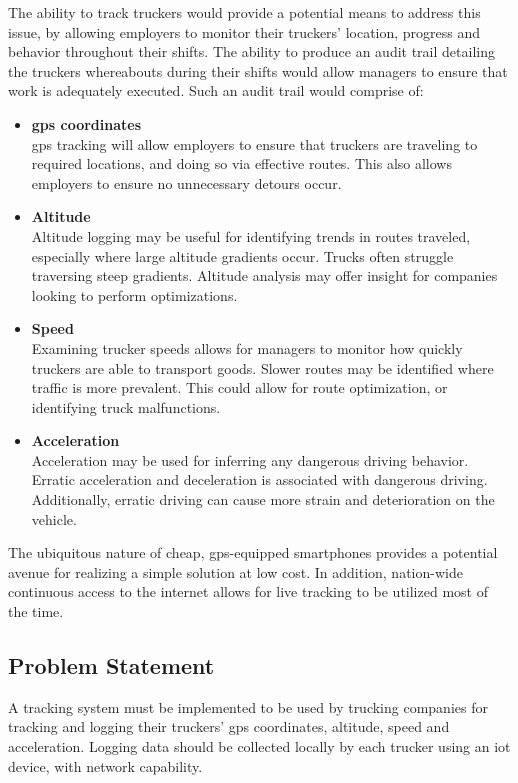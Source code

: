 The ability to track truckers would provide a potential means to address this issue, by allowing employers to monitor their truckers' location, progress and behavior throughout their shifts.
The ability to produce an audit trail detailing the truckers whereabouts during their shifts would allow managers to ensure that work is adequately executed. Such an audit trail would comprise of:
\begin{itemize}
\item \textbf{\ac{gps} coordinates\\}
\ac{gps} tracking will allow employers to ensure that truckers are traveling to required locations, and doing so via effective routes. This also allows employers to ensure no unnecessary detours occur.
\item \textbf{Altitude\\}
Altitude logging may be useful for identifying trends in routes traveled, especially where large altitude gradients occur.
Trucks often struggle traversing steep gradients.
Altitude analysis may offer insight for companies looking to perform optimizations.
\item \textbf{Speed\\}
Examining trucker speeds allows for managers to monitor how quickly truckers are able to transport goods.
Slower routes may be identified where traffic is more prevalent.
This could allow for route optimization, or identifying truck malfunctions.
\item \textbf{Acceleration\\}
Acceleration may be used for inferring any dangerous driving behavior. 
Erratic acceleration and deceleration is associated with dangerous driving.
Additionally, erratic driving can cause more strain and deterioration on the vehicle.
\end{itemize}

The ubiquitous nature of cheap, \ac{gps}-equipped smartphones provides a potential avenue for realizing a simple solution at low cost.
In addition, nation-wide continuous access to the internet allows for live tracking to be utilized most of the time.

\subsection{Problem Statement}
A tracking system must be implemented to be used by trucking companies for tracking and logging their truckers' \ac{gps} coordinates, altitude, speed and acceleration.
Logging data should be collected locally by each trucker using an \ac{iot} device, with network capability.

